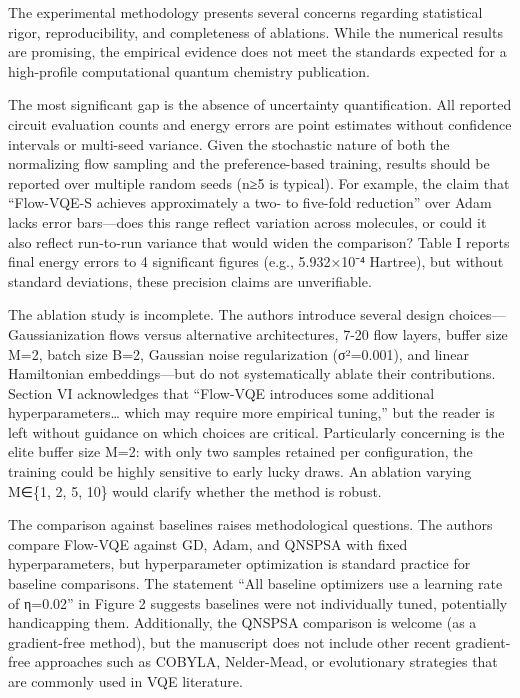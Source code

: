 \documentclass[10pt,letterpaper]{article}
\begin{document}
The experimental methodology presents several concerns regarding statistical rigor, reproducibility, and completeness of ablations. While the numerical results are promising, the empirical evidence does not meet the standards expected for a high-profile computational quantum chemistry publication.

The most significant gap is the absence of uncertainty quantification. All reported circuit evaluation counts and energy errors are point estimates without confidence intervals or multi-seed variance. Given the stochastic nature of both the normalizing flow sampling and the preference-based training, results should be reported over multiple random seeds (n≥5 is typical). For example, the claim that ``Flow-VQE-S achieves approximately a two- to five-fold reduction'' over Adam lacks error bars---does this range reflect variation across molecules, or could it also reflect run-to-run variance that would widen the comparison? Table I reports final energy errors to 4 significant figures (e.g., 5.932×10⁻⁴ Hartree), but without standard deviations, these precision claims are unverifiable.

The ablation study is incomplete. The authors introduce several design choices---Gaussianization flows versus alternative architectures, 7-20 flow layers, buffer size M=2, batch size B=2, Gaussian noise regularization (σ²=0.001), and linear Hamiltonian embeddings---but do not systematically ablate their contributions. Section VI acknowledges that ``Flow-VQE introduces some additional hyperparameters\ldots{} which may require more empirical tuning,'' but the reader is left without guidance on which choices are critical. Particularly concerning is the elite buffer size M=2: with only two samples retained per configuration, the training could be highly sensitive to early lucky draws. An ablation varying M∈\{1, 2, 5, 10\} would clarify whether the method is robust.

The comparison against baselines raises methodological questions. The authors compare Flow-VQE against GD, Adam, and QNSPSA with fixed hyperparameters, but hyperparameter optimization is standard practice for baseline comparisons. The statement ``All baseline optimizers use a learning rate of η=0.02'' in Figure 2 suggests baselines were not individually tuned, potentially handicapping them. Additionally, the QNSPSA comparison is welcome (as a gradient-free method), but the manuscript does not include other recent gradient-free approaches such as COBYLA, Nelder-Mead, or evolutionary strategies that are commonly used in VQE literature.
\end{document}
